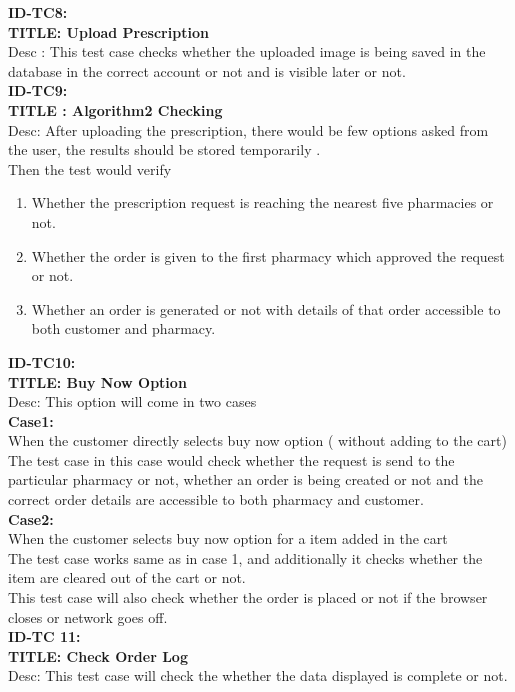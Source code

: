 \documentclass{article}
\begin{document}
 \textbf{ID-TC8:}\\
 \textbf{TITLE: Upload Prescription}\\
Desc : This test case checks whether the uploaded image is being saved in the database in the correct account or not and is visible later or not.\\

 \textbf{ID-TC9:}\\
 \textbf{TITLE : Algorithm2 Checking}\\
Desc: After uploading the prescription, there would be few options asked from the user, the results should be stored temporarily .\\
Then the test would verify
\begin{enumerate}	
\item Whether the prescription request is reaching the nearest five pharmacies or not.
\item	Whether the order is given to the first pharmacy which approved the request or not.
\item	Whether an order is generated or not with details of that order accessible to both customer and pharmacy.
\end{enumerate}

\textbf{ID-TC10:}\\
 \textbf{TITLE: Buy Now Option}\\
Desc: This option will come in two cases\\
\textbf{Case1:}\\
When the customer directly selects buy now option  ( without adding to the cart)\\
The test case in this case would check whether the request is send to the particular pharmacy or not, whether an order is being created or not and the correct order details are accessible to both pharmacy and customer.\\

 \textbf{Case2:}\\
When the customer selects buy now option for a item added in the cart\\
The test case works same as in case 1, and additionally it checks whether the item are cleared out of the cart or not.
\\This test case will also check whether the order is placed or not if the browser closes or network goes off.\\

 \textbf{ID-TC 11:}\\
 \textbf{TITLE: Check Order Log}\\
Desc: This test case will check the whether the data displayed is complete or not.\\
\end{document}
